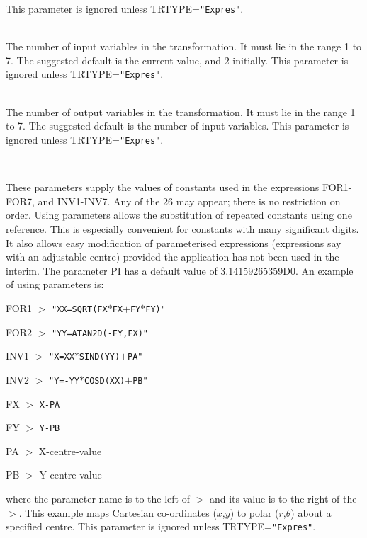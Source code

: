 \documentclass[twoside,11pt]{article}
\newcommand{\sstsubsection}[1]{ \item[{#1}] \mbox{} \\}
\newcommand{\sstsubsection}[1]{\item[{#1}]}
\begin{document}
{{{         This parameter is ignored unless TRTYPE={\tt "Expres"}.
      }
      \sstsubsection{
         NVIN = \_INTEGER (Read)
      }{
         The number of input variables in the transformation.  It must
         lie in the range 1 to 7.  The suggested default is the current
         value, and 2 initially.   This parameter is ignored unless
         TRTYPE={\tt "Expres"}.
      }
      \sstsubsection{
         NVOUT = \_INTEGER (Read)
      }{
         The number of output variables in the transformation.  It must
         lie in the range 1 to 7.  The suggested default is the number
         of input variables.   This parameter is ignored unless
         TRTYPE={\tt "Expres"}.
      }
      \sstsubsection{
         PA-PZ = \_DOUBLE (Read)
      }{
         These parameters supply the values of constants used in the
         expressions FOR1-FOR7, and INV1-INV7.  Any of the 26 may
         appear; there is no restriction on order.  Using parameters
         allows the substitution of repeated constants using one
         reference.  This is especially convenient for constants with
         many significant digits.  It also allows easy modification of
         parameterised expressions (expressions say with an adjustable
         centre) provided the application has not been used in the
         interim.  The parameter PI has a default value of
         3.14159265359D0.  An example of using parameters is:
         \begin{description}
         \item FOR1 $>$ {\tt "XX=SQRT(FX$*$FX$+$FY$*$FY)"}
         \item FOR2 $>$ {\tt "YY=ATAN2D(-FY,FX)"}
         \item INV1 $>$ {\tt "X=XX$*$SIND(YY)$+$PA"}
         \item INV2 $>$ {\tt "Y=-YY$*$COSD(XX)$+$PB"}
         \item FX $>$ {\tt X-PA}
         \item FY $>$ {\tt Y-PB}
         \item PA $>$ X-centre-value
         \item PB $>$ Y-centre-value
         \end{description}
         where the parameter name is to the left of $>$ and its value is
         to the right of the $>$.  This example maps Cartesian
         co-ordinates ($x$,$y$) to polar ($r$,$\theta$) about a specified
         centre.
         This parameter is ignored unless TRTYPE={\tt "Expres"}.
      }
      \sstsubsection{
         PREC = LITERAL (Read)
      }{
}}}
\end{document}
